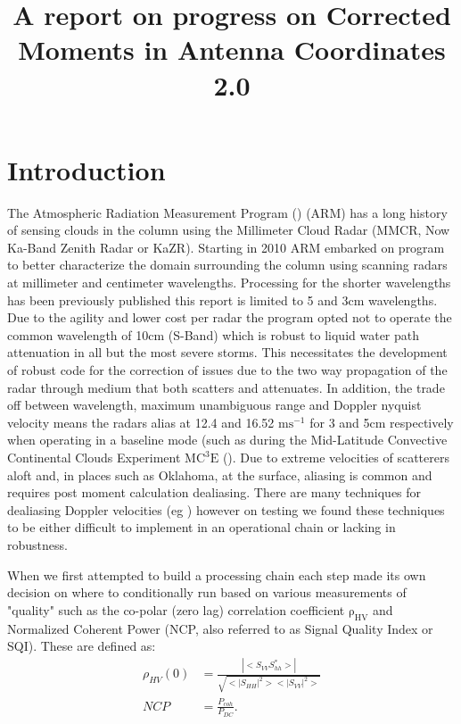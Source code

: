 \documentclass[twocol]{ametsoc}
\title{A report on progress on Corrected Moments in Antenna Coordinates 2.0}
\affiliation{Environmental Science Division, Argonne National Laboratory}
\begin{document}
\maketitle


\section{Introduction}
\label{sec:intro}
The Atmospheric Radiation Measurement Program (\cite{mather_arm_2012}) (ARM) has a long history of sensing clouds in the column using the Millimeter 
Cloud Radar (MMCR, Now Ka-Band Zenith Radar or KaZR). Starting in 2010 ARM embarked on program to better characterize the domain surrounding the 
column using scanning radars at millimeter and centimeter wavelengths. Processing for the shorter wavelengths has been previously published  \cite{kollias_scanning_2013} 
this report is limited to 5 and 3cm wavelengths. Due to the agility and lower cost per radar the program opted not to operate the common wavelength of 
10cm (S-Band) which is  robust to liquid water path attenuation in all but the most severe storms. This necessitates the development of robust code for the 
correction of issues due to the two way propagation of the radar through medium that both scatters and attenuates. In addition, the trade off between wavelength, 
maximum unambiguous range and Doppler nyquist velocity means the radars alias at 12.4 and 16.52 $\mathrm{ms^{-1}}$ for 3 and 5cm respectively when 
operating in a baseline mode (such as during the Mid-Latitude  Convective Continental Clouds Experiment $\mathrm{MC^3E} $ (\cite{jensen_midlatitude_2015}).
 Due to extreme velocities of scatterers aloft and, in places such as Oklahoma, at the surface, aliasing is common and requires post moment calculation dealiasing. 
 There are many techniques for dealiasing Doppler velocities (eg \cite{james_real-time_2001}) however on testing we found these techniques to be either 
 difficult to implement in an operational chain or lacking in robustness. 

When we first attempted to build a processing chain each step made its own decision on where to conditionally run based on various measurements
 of "quality"  such as the co-polar (zero lag) correlation coefficient $\mathrm{\rho_{HV}}$ and Normalized Coherent Power (NCP, also referred to as 
 Signal Quality Index or SQI). These are defined as:
\begin{align}
\rho_{HV}(0) &= \frac{|<S_{VV}S_{hh}^*>|}{\sqrt{<|S_{HH}|^2><|S_{VV}|^2>}}\\
NCP &= \frac{P_{coh}}{P_{DC}}.
\end{align}
\end{document}
